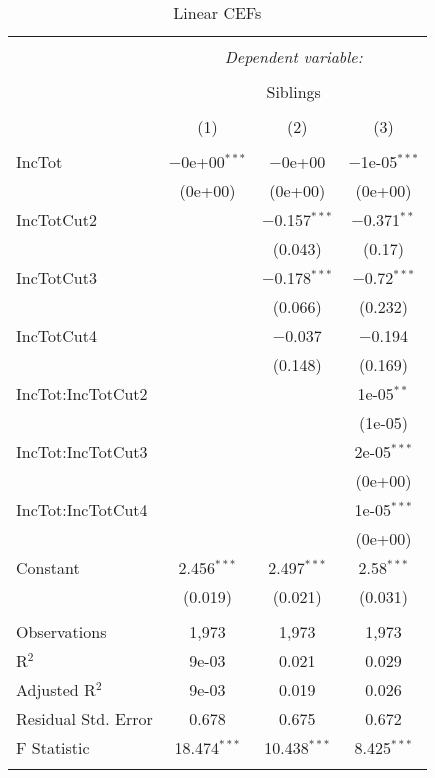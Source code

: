 
\begin{table}[H] \centering 
  \caption{Linear CEFs} 
  \label{} 
\begin{tabular}{@{\extracolsep{5pt}}lccc} 
\\[-1.8ex]\hline 
\hline \\[-1.8ex] 
 & \multicolumn{3}{c}{\textit{Dependent variable:}} \\ 
\cline{2-4} 
\\[-1.8ex] & \multicolumn{3}{c}{Siblings} \\ 
\\[-1.8ex] & (1) & (2) & (3)\\ 
\hline \\[-1.8ex] 
 IncTot & $-$0e+00$^{***}$ & $-$0e+00 & $-$1e-05$^{***}$ \\ 
  & (0e+00) & (0e+00) & (0e+00) \\ 
  IncTotCut2 &  & $-$0.157$^{***}$ & $-$0.371$^{**}$ \\ 
  &  & (0.043) & (0.17) \\ 
  IncTotCut3 &  & $-$0.178$^{***}$ & $-$0.72$^{***}$ \\ 
  &  & (0.066) & (0.232) \\ 
  IncTotCut4 &  & $-$0.037 & $-$0.194 \\ 
  &  & (0.148) & (0.169) \\ 
  IncTot:IncTotCut2 &  &  & 1e-05$^{**}$ \\ 
  &  &  & (1e-05) \\ 
  IncTot:IncTotCut3 &  &  & 2e-05$^{***}$ \\ 
  &  &  & (0e+00) \\ 
  IncTot:IncTotCut4 &  &  & 1e-05$^{***}$ \\ 
  &  &  & (0e+00) \\ 
  Constant & 2.456$^{***}$ & 2.497$^{***}$ & 2.58$^{***}$ \\ 
  & (0.019) & (0.021) & (0.031) \\ 
 \hline \\[-1.8ex] 
Observations & 1,973 & 1,973 & 1,973 \\ 
R$^{2}$ & 9e-03 & 0.021 & 0.029 \\ 
Adjusted R$^{2}$ & 9e-03 & 0.019 & 0.026 \\ 
Residual Std. Error & 0.678 & 0.675 & 0.672 \\ 
F Statistic & 18.474$^{***}$ & 10.438$^{***}$ & 8.425$^{***}$ \\ 
\hline 
\hline \\[-1.8ex] 
\end{tabular} 
\end{table} 
